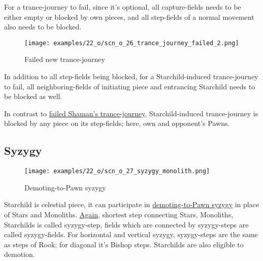 For a trance-journey to fail, since it's optional, all capture-fields needs to be either empty or
blocked by own pieces, and all step-fields of a normal movement also needs to be blocked.

\clearpage %

\noindent
\begin{figure}[!h]
\texttt{[image: examples/22\_o/scn\_o\_26\_trance\_journey\_failed\_2.png]}
\caption{Failed new trance-journey}
\label{fig:scn_o_26_trance_journey_failed_2}
\end{figure}

In addition to all step-fields being blocked, for a Starchild-induced trance-journey to fail, all
neighboring-fields of initiating piece and entrancing Starchild needs to be blocked as well.

In contrast to \hyperref[fig:scn_o_25_trance_journey_failed]{failed Shaman's trance-journey},
Starchild-induced trance-journey is blocked by any piece on its step-fields; here, own and
opponent's Pawns.

\clearpage %

\subsection*{Syzygy}

\vspace*{-1.3\baselineskip}
\noindent
\begin{figure}[!h]
\texttt{[image: examples/22\_o/scn\_o\_27\_syzygy\_monolith.png]}
\caption{Demoting-to-Pawn syzygy}
\label{fig:scn_o_27_syzygy_monolith}
\end{figure}

Starchild is celestial piece, it can participate in
\hyperref[fig:scn_d_19_syzygy_2_stars_init]{demoting-to-Pawn syzygy} in place of Stars and Monoliths.
\hyperref[fig:scn_d_21_syzygy_2_monoliths_init]{Again}, shortest step connecting Stars, Monoliths,
Starchilds is called syzygy-step, fields which are connected by syzygy-steps are called syzygy-fields.
For horizontal and vertical syzygy, syzygy-steps are the same as steps of Rook; for diagonal it's
Bishop steps. Starchilds are also eligible to demotion.

\clearpage %

